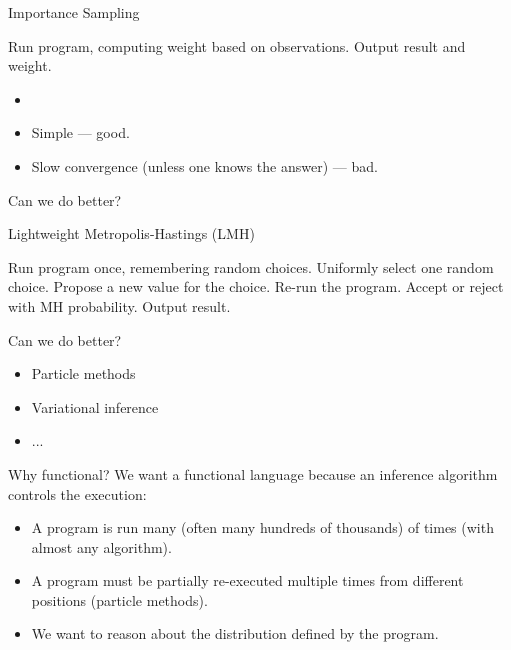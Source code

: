\documentclass{beamer}
\begin{document}
\begin{frame}{Importance Sampling}
    \begin{algorithmic}
        \Loop
            \State Run program, computing weight based on observations.
            \State Output result and weight.
        \EndLoop
    \end{algorithmic}
    \begin{itemize}
        \item[] 
         \item Simple --- good.
         \item Slow convergence (unless one knows the answer) --- bad.
     \end{itemize}
     \vfill
     Can we do better?
\end{frame}

\begin{frame}{Lightweight Metropolis-Hastings (LMH)}
\begin{algorithmic}
    \State Run program once, remembering random choices.
    \Loop
         \State Uniformly select one random choice.
         \State Propose a new value for the choice.
         \State Re-run the program.
         \State Accept or reject with MH probability.
         \State Output result.
    \EndLoop
\end{algorithmic}
\vfill
Can we do better?
\begin{itemize}
    \item Particle methods
    \item Variational inference
    \item ...
\end{itemize}
\end{frame}

\begin{frame}{Why functional?}
    We want a functional language because an inference algorithm
    controls the execution:
    \begin{itemize}
        \item A program is run many (often many hundreds of
            thousands) of times (with almost any algorithm).
        \item A program must be partially re-executed multiple
            times from different positions (particle methods).
        \item We want to reason about the distribution defined
            by the program.
    \end{itemize}
\end{frame}
\end{document}

